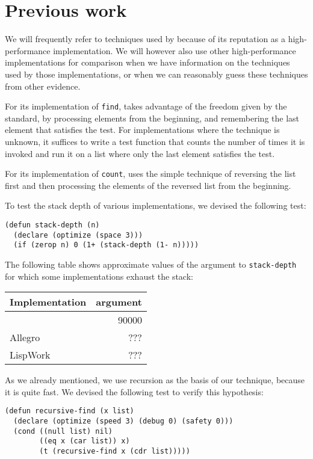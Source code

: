 \section{Previous work}

We will frequently refer to techniques used by \sbcl{} because of its
reputation as a high-performance implementation.  We will however also
use other high-performance implementations for comparison when we have
information on the techniques used by those implementations, or when
we can reasonably guess these techniques from other evidence.

For its implementation of \texttt{find}, \sbcl{} takes advantage of
the freedom given by the standard, by processing elements from the
beginning, and remembering the last element that satisfies the test.
For implementations where the technique is unknown, it suffices to
write a test function that counts the number of times it is invoked
and run it on a list where only the last element satisfies the test.

For its implementation of \texttt{count}, \sbcl{} uses the simple
technique of reversing the list first and then processing the elements
of the reversed list from the beginning.

To test the stack depth of various implementations, we devised the
following test:

\begin{verbatim}
(defun stack-depth (n)
  (declare (optimize (space 3)))
  (if (zerop n) 0 (1+ (stack-depth (1- n)))))
\end{verbatim}

The following table shows approximate values of the argument to
\texttt{stack-depth} for which some implementations exhaust the stack:

\begin{tabular}{|l|r|}
\hline
Implementation & argument\\
\hline
\hline
\sbcl{} & 90000\\
\hline
Allegro & ???\\
\hline
LispWork & ???\\
\hline
\end{tabular}

As we already mentioned, we use recursion as the basis of our
technique, because it is quite fast.  We devised the following test to
verify this hypothesis:

\begin{verbatim}
(defun recursive-find (x list)
  (declare (optimize (speed 3) (debug 0) (safety 0)))
  (cond ((null list) nil)
        ((eq x (car list)) x)
        (t (recursive-find x (cdr list)))))
\end{verbatim}

